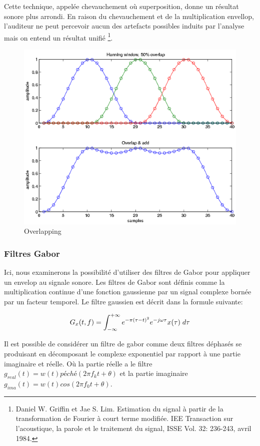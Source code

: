 Cette technique, appelée chevauchement où superposition, donne un résultat sonore plus arrondi. En raison du chevauchement et de la multiplication envellop, l'auditeur ne peut percevoir aucun des artefacts possibles induits par l'analyse mais on entend un résultat unifié \footnote {Daniel W. Griffin et Jae S. Lim. Estimation du signal à partir de la transformation de Fourier à court terme modifiée. IEE Transaction sur l'acoustique, la parole et le traitement du signal, ISSE Vol. 32: 236-243, avril 1984.}. 
 
         \begin{figure}
            \centering
            \includegraphics[width = 0.5 \textwidth ]{Graphs/Overlapping.png}
            \caption{Overlapping}
            \label{overlapping}
        \end{figure}

\subsubsection{Filtres Gabor}

Ici, nous examinerons la possibilité d’utiliser des filtres de Gabor pour appliquer un envelop au signale sonore. Les filtres de Gabor sont définis comme la multiplication continue d'une fonction gaussienne par un signal complexe bornée par un facteur temporel. Le filtre gaussien est décrit dans la formule suivante:

\begin{equation}
    G_x(t,f) = \int_{-\infty}^{+\infty} e ^ {-\pi(\tau-t)^2} e ^ {-j\omega \tau} x(\tau)\hspace{1mm} d\tau  
\end{equation}

Il est possible de considérer un filtre de gabor comme deux filtres déphasés se produisant en décomposant le complexe exponentiel par rapport à une partie imaginaire et réelle. Où la partie réelle a le filtre $ g_ {real} (t) = w (t) péché (2 \pi f_k t + \theta) $ et la partie imaginaire $ g_{ima} (t) = w (t) cos (2 \pi f_0 t + \theta) $.


